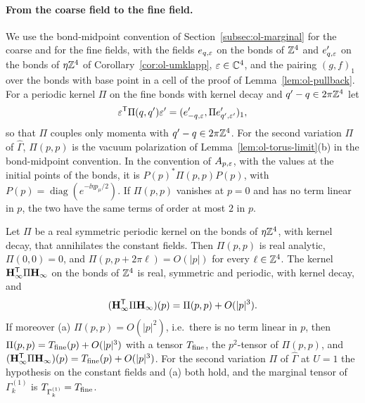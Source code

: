 \paragraph{From the coarse field to the fine field.} We use the bond-midpoint convention of Section~\ref{subsec:ol-marginal} for the coarse and for the fine fields, with the fields $e_{q,\varepsilon}$ on the bonds of $\mathbb Z^4$ and $e'_{q,\varepsilon}$ on the bonds of $\eta\mathbb Z^4$ of Corollary~\ref{cor:ol-umklapp}, $\varepsilon\in\mathbb C^4$, and the pairing $(g,f)_1$ over the bonds with base point in a cell of the proof of Lemma~\ref{lem:ol-pullback}. For a periodic kernel $\Pi$ on the fine bonds with kernel decay and $q'-q\in2\pi\mathbb Z^4$ let
\[
\varepsilon^{\sf T}\Pi(q,q')\varepsilon'=(e'_{-q,\varepsilon},\Pi e'_{q',\varepsilon'})_1 ,
\]
so that $\Pi$ couples only momenta with $q'-q\in2\pi\mathbb Z^4$. For the second variation $\Pi$ of $\widehat\Gamma$, $\Pi(p,p)$ is the vacuum polarization of Lemma~\ref{lem:ol-torus-limit}(b) in the bond-midpoint convention. In the convention of $A_{p,\varepsilon}$, with the values at the initial points of the bonds, it is $P(p)^*\Pi(p,p)P(p)$, with $P(p)=\operatorname{diag}(e^{-\ii\eta p_\mu/2})$. If $\Pi(p,p)$ vanishes at $p=0$ and has no term linear in $p$, the two have the same terms of order at most $2$ in $p$.

\begin{lemma}\label{lem:ol-coarse-map}
Let $\Pi$ be a real symmetric periodic kernel on the bonds of $\eta\mathbb Z^4$, with kernel decay, that annihilates the constant fields. Then $\Pi(p,p)$ is real analytic, $\Pi(0,0)=0$, and $\Pi(p,p+2\pi\ell)=O(|p|)$ for every $\ell\in\mathbb Z^4$. The kernel $\mathbf H_\infty^{\sf T}\Pi\mathbf H_\infty$ on the bonds of $\mathbb Z^4$ is real, symmetric and periodic, with kernel decay, and
\[
(\mathbf H_\infty^{\sf T}\Pi\mathbf H_\infty)(p)=\Pi(p,p)+O(|p|^3).
\]
If moreover (a) $\Pi(p,p)=O(|p|^2)$, i.e.\ there is no term linear in $p$, then $\Pi(p,p)=T_{\rm fine}(p)+O(|p|^3)$ with a tensor $T_{\rm fine}$, the $p^2$-tensor of $\Pi(p,p)$, and $(\mathbf H_\infty^{\sf T}\Pi\mathbf H_\infty)(p)=T_{\rm fine}(p)+O(|p|^3)$. For the second variation $\Pi$ of $\widehat\Gamma$ at $U=1$ the hypothesis on the constant fields and (a) both hold, and the marginal tensor of $\Gamma^{(1)}_k$ is $T_{\Gamma^{(1)}_k}=T_{\rm fine}$.
\end{lemma}

